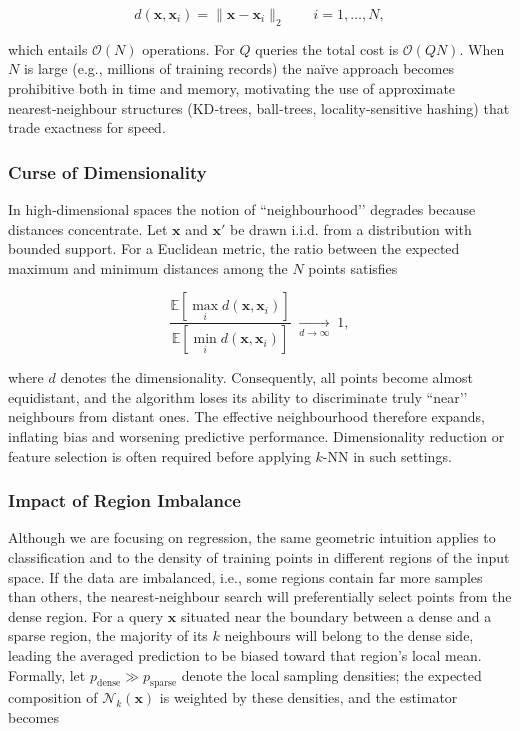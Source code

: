 \documentclass[12pt, a4paper]{article}
\begin{document}
\[
d(\mathbf{x},\mathbf{x}_i)=\|\mathbf{x}-\mathbf{x}_i\|_2 \qquad i=1,\dots,N,
\]

which entails \(\mathcal{O}(N)\) operations.  For \(Q\) queries the total cost is \(\mathcal{O}(QN)\).  When \(N\) is large (e.g., millions of training records) the naïve approach becomes prohibitive both in time and memory, motivating the use of approximate nearest‑neighbour structures (KD‑trees, ball‑trees, locality‑sensitive hashing) that trade exactness for speed.

\subsubsection{Curse of Dimensionality}
In high‑dimensional spaces the notion of “neighbourhood’’ degrades because distances concentrate.  Let \(\mathbf{x}\) and \(\mathbf{x}'\) be drawn i.i.d. from a distribution with bounded support.  For a Euclidean metric, the ratio between the expected maximum and minimum distances among the \(N\) points satisfies  

\[
\frac{\mathbb{E}[\max_{i} d(\mathbf{x},\mathbf{x}_i)]}
     {\mathbb{E}[\min_{i} d(\mathbf{x},\mathbf{x}_i)]}
     \;\xrightarrow[d\to\infty]{}\; 1,
\]

where \(d\) denotes the dimensionality.  Consequently, all points become almost equidistant, and the algorithm loses its ability to discriminate truly “near’’ neighbours from distant ones.  The effective neighbourhood therefore expands, inflating bias and worsening predictive performance.  Dimensionality reduction or feature selection is often required before applying \(k\)-NN in such settings.

\subsubsection{Impact of Region Imbalance}
Although we are focusing on regression, the same geometric intuition applies to classification and to the density of training points in different regions of the input space.  If the data are imbalanced, i.e., some regions contain far more samples than others, the nearest‑neighbour search will preferentially select points from the dense region.  For a query \(\mathbf{x}\) situated near the boundary between a dense and a sparse region, the majority of its \(k\) neighbours will belong to the dense side, leading the averaged prediction to be biased toward that region’s local mean.  Formally, let \(p_{\text{dense}} \gg p_{\text{sparse}}\) denote the local sampling densities; the expected composition of \(\mathcal{N}_k(\mathbf{x})\) is weighted by these densities, and the estimator becomes  
\end{document}
